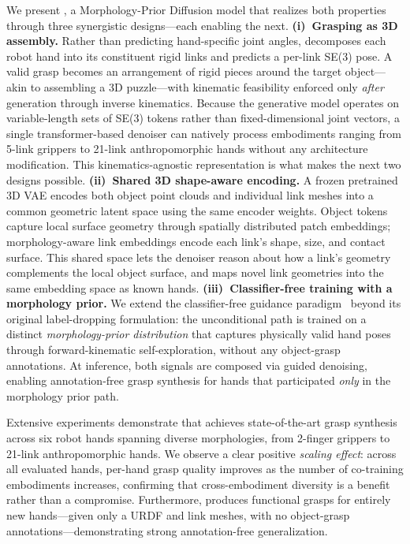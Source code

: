 We present \modelname, a Morphology-Prior Diffusion model that realizes both properties through three synergistic designs---each enabling the next.
%
\textbf{(i)~Grasping as 3D assembly.}
Rather than predicting hand-specific joint angles, \modelname decomposes each robot hand into its constituent rigid links and predicts a per-link SE(3) pose.
A valid grasp becomes an arrangement of rigid pieces around the target object---akin to assembling a 3D puzzle---with kinematic feasibility enforced only \emph{after} generation through inverse kinematics.
Because the generative model operates on variable-length sets of SE(3) tokens rather than fixed-dimensional joint vectors, a single transformer-based denoiser can natively process embodiments ranging from 5-link grippers to 21-link anthropomorphic hands without any architecture modification.
This kinematics-agnostic representation is what makes the next two designs possible.
%
\textbf{(ii)~Shared 3D shape-aware encoding.}
A frozen pretrained 3D VAE encodes both object point clouds and individual link meshes into a common geometric latent space using the same encoder weights.
Object tokens capture local surface geometry through spatially distributed patch embeddings; morphology-aware link embeddings encode each link's shape, size, and contact surface.
This shared space lets the denoiser reason about how a link's geometry complements the local object surface, and maps novel link geometries into the same embedding space as known hands.
%
\textbf{(iii)~Classifier-free training with a morphology prior.}
We extend the classifier-free guidance paradigm~\cite{ho2022classifierfree} beyond its original label-dropping formulation: the unconditional path is trained on a distinct \emph{morphology-prior distribution} that captures physically valid hand poses through forward-kinematic self-exploration, without any object-grasp annotations.
At inference, both signals are composed via guided denoising, enabling annotation-free grasp synthesis for hands that participated \emph{only} in the morphology prior path.

Extensive experiments demonstrate that \modelname achieves state-of-the-art grasp synthesis across six robot hands spanning diverse morphologies, from 2-finger grippers to 21-link anthropomorphic hands.
We observe a clear positive \emph{scaling effect}: across all evaluated hands, per-hand grasp quality improves as the number of co-training embodiments increases, confirming that cross-embodiment diversity is a benefit rather than a compromise.
Furthermore, \modelname produces functional grasps for entirely new hands---given only a URDF and link meshes, with no object-grasp annotations---demonstrating strong annotation-free generalization.

